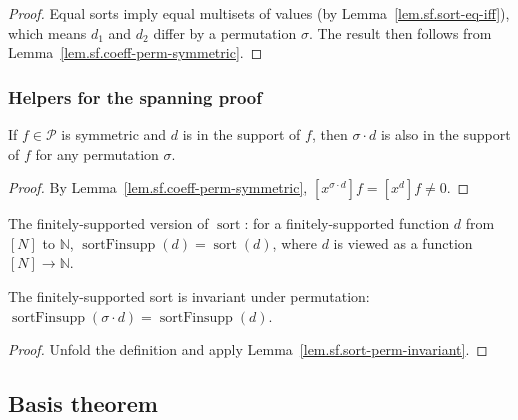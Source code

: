 \begin{proof}
\leanok
Equal sorts imply equal multisets of values (by Lemma~\ref{lem.sf.sort-eq-iff}),
which means $d_1$ and $d_2$ differ by a
permutation $\sigma$. The result then follows from Lemma~\ref{lem.sf.coeff-perm-symmetric}.
\end{proof}

\subsubsection{Helpers for the spanning proof}

\begin{lemma}
\label{lem.sf.support-closed-perm}
\leanhelper
\leanok
If $f \in \mathcal{P}$ is symmetric and $d$ is in the support of $f$,
then $\sigma \cdot d$ is also in the support of $f$ for any permutation $\sigma$.
\end{lemma}

\begin{proof}
\leanok
By Lemma~\ref{lem.sf.coeff-perm-symmetric}, $[x^{\sigma \cdot d}] f = [x^d] f \neq 0$.
\end{proof}

\begin{definition}
\label{def.sf.sortTupleFinsupp}
\leanhelper
\leanok
The finitely-supported version of $\operatorname{sort}$: for a finitely-supported function $d$ from $[N]$ to $\mathbb{N}$,
$\operatorname{sortFinsupp}(d) = \operatorname{sort}(d)$, where $d$ is viewed as a function $[N] \to \mathbb{N}$.
\end{definition}

\begin{lemma}
\label{lem.sf.sortTupleFinsupp-perm}
\leanhelper
\leanok
The finitely-supported sort is invariant under permutation:
$\operatorname{sortFinsupp}(\sigma \cdot d) = \operatorname{sortFinsupp}(d)$.
\end{lemma}

\begin{proof}
\leanok
Unfold the definition and apply Lemma~\ref{lem.sf.sort-perm-invariant}.
\end{proof}

\subsection{Basis theorem}


